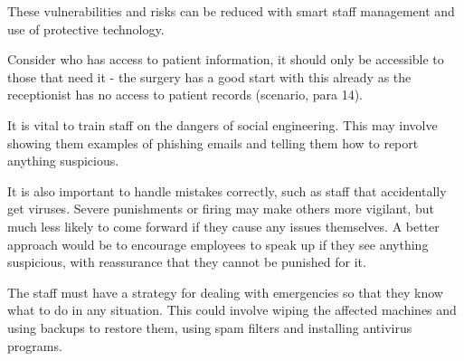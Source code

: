 \documentclass[12pt,a4paper]{article}
\begin{document}
These vulnerabilities and risks can be reduced with smart staff management and use of protective technology.

Consider who has access to patient information, it should only be accessible to those that need it - the surgery has a good start with this already as the receptionist has no access to patient records (scenario, para 14).

It is vital to train staff on the dangers of social engineering. This may involve showing them examples of phishing emails and telling them how to report anything suspicious.

It is also important to handle mistakes correctly, such as staff that accidentally get viruses. Severe punishments or firing may make others more vigilant, but much less likely to come forward if they cause any issues themselves. A better approach would be to encourage employees to speak up if they see anything suspicious, with reassurance that they cannot be punished for it.

The staff must have a strategy for dealing with emergencies so that they know what to do in any situation. This could involve wiping the affected machines and using backups to restore them, using spam filters and installing antivirus programs.



\end{document}
